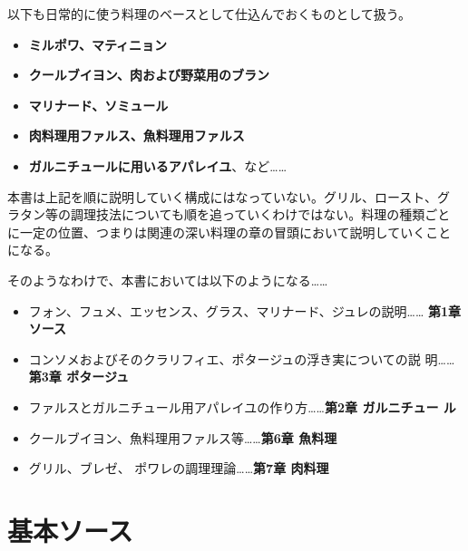 \vspace{1\zw}

以下も日常的に使う料理のベースとして仕込んでおくものとして扱う。

\begin{itemize}
\tightlist
\item
  \textbf{ミルポワ、マティニョン}
\item
  \textbf{クールブイヨン、肉および野菜用のブラン}
\item
  \textbf{マリナード、ソミュール}
\item
  \textbf{肉料理用ファルス、魚料理用ファルス}
\item
  \textbf{ガルニチュールに用いるアパレイユ}、など\ldots{}\ldots{}
\end{itemize}

\vspace{1\zw}

本書は上記を順に説明していく構成にはなっていない。グリル、ロースト、グ
ラタン等の調理技法についても順を追っていくわけではない。料理の種類ごと
に一定の位置、つまりは関連の深い料理の章の冒頭において説明していくこと
になる。

\vspace{1\zw}

そのようなわけで、本書においては以下のようになる\ldots{}\ldots{}

\begin{itemize}
\tightlist
\item
  フォン、フュメ、エッセンス、グラス、マリナード、ジュレの説明\ldots{}\ldots{}
  \textbf{ 第1章 ソース}
\item
  コンソメおよびそのクラリフィエ、ポタージュの浮き実についての説
  明\ldots{}\ldots{}\textbf{第3章 ポタージュ}
\item
  ファルスとガルニチュール用アパレイユの作り方\ldots{}\ldots{}\textbf{第2章
  ガルニチュー ル}
\item
  クールブイヨン、魚料理用ファルス等\ldots{}\ldots{}\textbf{第6章
  魚料理}
\item
  グリル、ブレゼ、 ポワレの調理理論\ldots{}\ldots{}\textbf{第7章 肉料理}
\end{itemize}

\newpage

\hypertarget{section-grandes-sauces-de-base}{%
\section{基本ソース}\label{section-grandes-sauces-de-base}}


